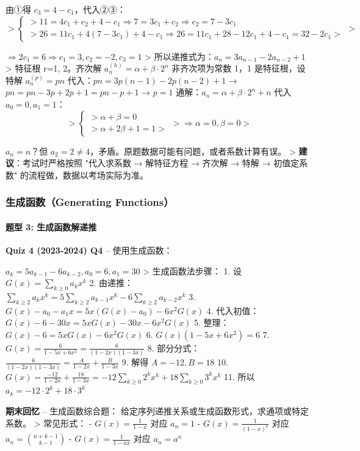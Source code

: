 \documentclass[10pt,a4paper,openany]{ctexbook}
\theoremstyle{definition}
\theoremstyle{remark}
\renewenvironment{quote}
  {\list{}{\leftmargin=1em\rightmargin=0pt\topsep=0.5pt\partopsep=0pt}\item[]}
  {\endlist}
\begin{document}
\begin{quote}
由①得 $c_3 = 4 - c_1$，代入②③：
\[
> \begin{cases}
> 11 = 4c_1 + c_2 + 4 - c_1 \Rightarrow 7 = 3c_1 + c_2 \Rightarrow c_2 = 7 - 3c_1 \\
> 26 = 11c_1 + 4(7-3c_1) + 4 - c_1 \Rightarrow 26 = 11c_1 + 28 - 12c_1 + 4 - c_1 = 32 - 2c_1
> \end{cases}
> 
\]

$\Rightarrow 2c_1 = 6 \Rightarrow c_1 = 3, c_2 = -2, c_3 = 1$
>
所以递推式为：$a_n = 3a_{n-1} - 2a_{n-2} + 1$
>
特征根 r=1, 2。齐次解 $a_n^{(h)} = \alpha + \beta \cdot 2^n$
非齐次项为常数 1，1 是特征根，设特解 $a_n^{(p)} = pn$
代入：$pn = 3p(n-1) - 2p(n-2) + 1$ → $pn = pn - 3p + 2p + 1 = pn - p + 1$ → $p = 1$
通解：$a_n = \alpha + \beta \cdot 2^n + n$
代入 $a_0=0, a_1=1$：
\[
> \begin{cases}
> \alpha + \beta = 0 \\
> \alpha + 2\beta + 1 = 1
> \end{cases}
> \Rightarrow \alpha = 0, \beta = 0
> 
\]

$a_n = n$？但 $a_2=2\neq 4$，矛盾。原题数据可能有问题，或者系数计算有误。
>
\textbf{建议}：考试时严格按照 "代入求系数 → 解特征方程 → 齐次解 → 特解 → 初值定系数" 的流程做，数据以考场实际为准。

\end{quote}

\subsubsection{生成函数（Generating Functions）}

\paragraph{题型 3: 生成函数解递推}

\textbf{Quiz 4 (2023-2024) Q4} -- 使用生成函数：
\begin{quote}
$a_k = 5a_{k-1} - 6a_{k-2}, a_0 = 6, a_1 = 30$
>
生成函数法步骤：
1. 设 $G(x) = \sum_{k \ge 0} a_k x^k$
2. 由递推：$\sum_{k\ge 2} a_k x^k = 5\sum_{k\ge 2} a_{k-1} x^k - 6\sum_{k\ge 2} a_{k-2} x^k$
3. $G(x) - a_0 - a_1 x = 5x(G(x) - a_0) - 6x^2 G(x)$
4. 代入初值：$G(x) - 6 - 30x = 5x G(x) - 30x - 6x^2 G(x)$
5. 整理：$G(x) - 6 = 5x G(x) - 6x^2 G(x)$
6. $G(x)(1 - 5x + 6x^2) = 6$
7. $G(x) = \frac{6}{1 - 5x + 6x^2} = \frac{6}{(1-2x)(1-3x)}$
8. 部分分式：$\frac{6}{(1-2x)(1-3x)} = \frac{A}{1-2x} + \frac{B}{1-3x}$
9. 解得 $A = -12, B = 18$
10. $G(x) = \frac{-12}{1-2x} + \frac{18}{1-3x} = -12\sum_{k\ge 0}2^k x^k + 18\sum_{k\ge 0}3^k x^k$
11. 所以 $a_k = -12 \cdot 2^k + 18 \cdot 3^k$

\textbf{期末回忆} -- 生成函数综合题：
给定序列递推关系或生成函数形式，求通项或特定系数。
>
常见形式：
- $G(x) = \frac{1}{1-x}$ 对应 $a_n = 1$
- $G(x) = \frac{1}{(1-x)^k}$ 对应 $a_n = \binom{n+k-1}{k-1}$
- $G(x) = \frac{1}{1-ax}$ 对应 $a_n = a^n$

\end{quote}
\end{document}

